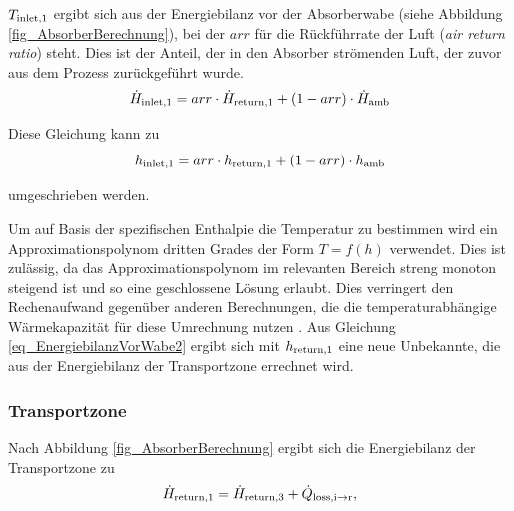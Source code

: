 $T_{\mathrm{inlet,}1}$ ergibt sich aus der Energiebilanz vor der Absorberwabe (siehe Abbildung \ref{fig_AbsorberBerechnung}), bei der $arr$ für die Rückführrate der Luft (\textit{air return ratio}) steht.
Dies ist der Anteil, der in den Absorber strömenden Luft, der zuvor aus dem Prozess zurückgeführt wurde.
\begin{equation} \label{eq_EnergiebilanzVorWabe}
    \dot{H}_{\mathrm{inlet,}1} = arr \cdot \dot{H}_{\mathrm{return,}1} + (1-arr) \cdot \dot{H}_{\mathrm{amb}}
\end{equation}

Diese Gleichung kann zu
\begin{equation} \label{eq_EnergiebilanzVorWabe2}
    h_{\mathrm{inlet,}1} = arr \cdot h_{\mathrm{return,}1} + (1-arr) \cdot h_{\mathrm{amb}}
\end{equation}

\vspace*{-\baselineskip}umgeschrieben werden.

Um auf Basis der spezifischen Enthalpie die Temperatur zu bestimmen wird ein Approximationspolynom dritten Grades der Form $T=f(h)$ verwendet.
Dies ist zulässig, da das Approximationspolynom im relevanten Bereich streng monoton steigend ist und so eine geschlossene Lösung erlaubt.
Dies verringert den Rechenaufwand gegenüber anderen Berechnungen, die die temperaturabhängige Wärmekapazität für diese Umrechnung nutzen \cite[S.96]{DissGall}.
Aus Gleichung \ref{eq_EnergiebilanzVorWabe2} ergibt sich mit $h_{\mathrm{return,}1}$ eine neue Unbekannte, die aus der Energiebilanz der Transportzone errechnet wird.


\subsubsection*{Transportzone} \label{subsubsec_EnergiebilanzTransportzone}
Nach Abbildung \ref{fig_AbsorberBerechnung} ergibt sich die Energiebilanz der Transportzone zu
\begin{equation} \label{eq_EnergiebilanzTransportzone}
\dot{H}_{\mathrm{return,}1} = \dot{H}_{\mathrm{return,}3} +\dot{Q}_{\mathrm{loss,i \to r}},
\end{equation}

